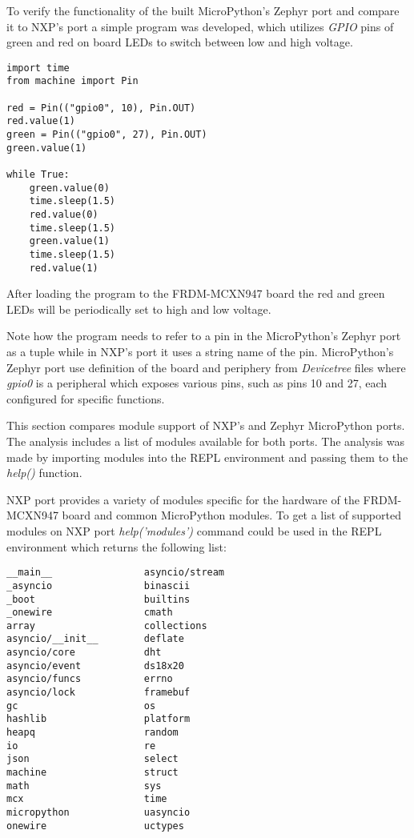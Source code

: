 \documentclass[twoside, 12pt]{article}
\begin{document}
To verify the functionality of the built MicroPython's Zephyr port and compare it to NXP's 
port a simple program was developed, which utilizes \textit{GPIO} pins of green and red on 
board LEDs to switch between low and high voltage.

\begin{lstlisting}[caption=Led program for MicroPython's Zephyr port, breaklines=true]
import time
from machine import Pin

red = Pin(("gpio0", 10), Pin.OUT)
red.value(1)
green = Pin(("gpio0", 27), Pin.OUT)
green.value(1)

while True:
    green.value(0)
    time.sleep(1.5)
    red.value(0)
    time.sleep(1.5)
    green.value(1)
    time.sleep(1.5)
    red.value(1)
\end{lstlisting}

After loading the program to the FRDM-MCXN947 board the red and green LEDs will be periodically set to high and low voltage.

Note how the program needs to refer to a pin in the MicroPython's Zephyr port as a tuple 
while in NXP's port it uses a string name of the pin. MicroPython's Zephyr port use 
definition of the board and periphery from \textit{Devicetree} files where \textit{gpio0} is 
a peripheral which exposes various pins, such as pins 10 and 27, each configured for specific 
functions.

This section compares module support of NXP's and Zephyr MicroPython ports. The analysis 
includes a list of modules available for both ports. The analysis was made by importing 
modules into the REPL environment and passing them to the \textit{help()} function.

NXP port provides a variety of modules specific for the hardware of the FRDM-MCXN947 board 
and common MicroPython modules. To get a list of supported modules on NXP port 
\textit{help('modules')} command could be used in the REPL environment which returns the 
following list:

\newpage

\begin{lstlisting}[caption=NXP's port modules, breaklines=true]
__main__                asyncio/stream
_asyncio                binascii      
_boot                   builtins      
_onewire                cmath         
array                   collections   
asyncio/__init__        deflate       
asyncio/core            dht           
asyncio/event           ds18x20       
asyncio/funcs           errno         
asyncio/lock            framebuf      
gc                      os
hashlib                 platform
heapq                   random
io                      re
json                    select
machine                 struct
math                    sys
mcx                     time
micropython             uasyncio
onewire                 uctypes
\end{lstlisting}
\end{document}
